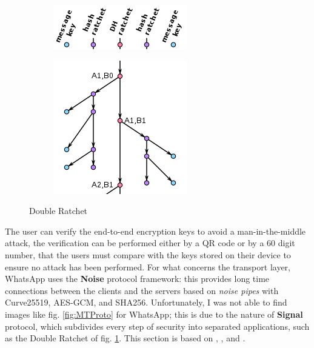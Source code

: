 \documentclass{article}
\begin{document}
\begin{figure}[t]
	\centering
	\begin{subfigure}[b]{0.5\textwidth}
		\includegraphics[width=1\linewidth]{images/doubleratchet_synt_header.png}
	\end{subfigure}
	\begin{subfigure}[b]{0.5\textwidth}
		\includegraphics[width=1\linewidth]{images/doubleratchet_synt.png}
	\end{subfigure}
	\caption{Double Ratchet \cite{dr_scheme}}
	\label{fig:doubleratchet}
\end{figure}

The user can verify the end-to-end encryption keys to avoid a man-in-the-middle attack, the verification can be performed either by a QR code or by a 60 digit number, that the users must compare with the keys stored on their device to ensure no attack has been performed.\newline 
For what concerns the transport layer, WhatsApp uses the \textbf{Noise} protocol framework: this provides long time connections between the clients and the servers based on \textit{noise pipes} with Curve25519, AES-GCM, and SHA256.\newline
Unfortunately, I was not able to find images like fig. \ref{fig:MTProto} for WhatsApp; this is due to the nature of \textbf{Signal} protocol, which subdivides every step of security into separated applications, such as the Double Ratchet of fig. \ref{fig:doubleratchet}. This section is based on \cite{what_tech_paper}, \cite{what_medium}, \cite{what_wiki} and \cite{signal}.
\end{document}
